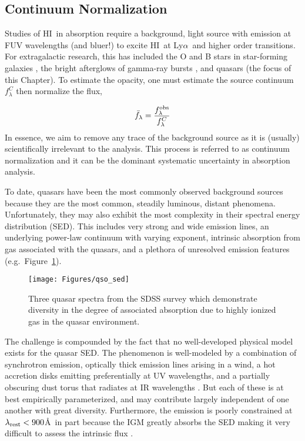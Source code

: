 \documentclass[graybox]{svmult}
\newcommand{\HI}{H{\sc I}}
\def\lya{Ly$\alpha$}
\begin{document}
\subsection{Continuum Normalization}
Studies of \HI\ in absorption require a background, light source
with emission at FUV wavelengths (and bluer!) to excite \HI\
at \lya\ and higher order transitions.
For extragalactic research, this has included the O and B stars
in star-forming galaxies \cite[]{lee+14}, the bright afterglows
of gamma-ray bursts \cite[]{fjp+09}, and quasars (the focus
of this Chapter).   To estimate the opacity, one must estimate
the source continuum $f^C_\lambda$ then normalize the flux, 

\begin{equation}
\bar f_\lambda = \frac{f_\lambda^{\rm obs}}{f_\lambda^C}
\end{equation}
In essence, we aim to remove any trace of the background
source as it is (usually)
scientifically irrelevant to the analysis.
This process is referred to as continuum normalization and
it can be the dominant systematic uncertainty in absorption
analysis.

To date, quasars have been the most commonly observed background
sources because they are the most common, steadily luminous, distant
phenomena.   Unfortunately, they may also exhibit the most complexity
in their spectral energy distribution (SED).  This includes
very strong and wide emission lines, an underlying power-law
continuum with varying exponent, intrinsic absorption from gas
associated with the quasars, and a plethora of unresolved emission
features (e.g.\ Figure~\ref{fig:qso_SED}).


%
\begin{figure}[b]
\sidecaption
\texttt{[image: Figures/qso\_sed]}
%
%
\caption{Three quasar spectra from the SDSS survey
which demonstrate diversity in the degree of associated
absorption due to highly ionized gas in the quasar
environment.
}
\label{fig:qso_SED}       %
\end{figure}

The challenge is compounded by the fact that no well-developed physical
model exists for the quasar SED.  The phenomenon is well-modeled
by a combination of synchrotron emission, optically thick
emission lines arising in a wind, a hot accretion disks 
emitting preferentially at UV wavelengths, and a partially
obscuring dust torus that radiates at IR wavelengths 
\cite[e.g.][]{lusso+14}.
But each of these is at best empirically parameterized, and may
contribute largely independent of one another
with great diversity.  Furthermore, the emission is
poorly constrained at $\lambda_{\rm rest} < 900$\AA\
in part because the IGM greatly absorbs the SED
making it very difficult to assess the intrinsic flux 
\cite[see][]{lusso+15}.
\end{document}
